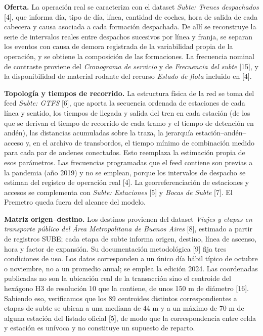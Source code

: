 \documentclass{article}
\begin{document}
\textbf{Oferta.} La operación real se caracteriza con el dataset \textit{Subte: Trenes despachados} [4],
que informa día, tipo de día, línea, cantidad de coches, hora de salida de cada cabecera y causa asociada a
cada formación despachada. De allí se reconstruye la serie de intervalos reales entre despachos sucesivos
por línea y franja, se separan los eventos con causa de demora registrada de la variabilidad propia de la
operación, y se obtiene la composición de las formaciones. La frecuencia nominal de contraste proviene del
\textit{Cronograma de servicio} y de \textit{Frecuencia del subte} [15], y la disponibilidad de material
rodante del recurso \textit{Estado de flota} incluido en [4].

\textbf{Topología y tiempos de recorrido.} La estructura física de la red se toma del feed
\textit{Subte: GTFS} [6], que aporta la secuencia ordenada de estaciones de cada línea y sentido, los
tiempos de llegada y salida del tren en cada estación (de los que se derivan el tiempo de recorrido de
cada tramo y el tiempo de detención en andén), las distancias acumuladas sobre la traza, la jerarquía
estación--andén--acceso y, en el archivo de transbordos, el tiempo mínimo de combinación medido para cada
par de andenes conectados. Esto reemplaza la estimación propia de esos parámetros. Las frecuencias programadas que el feed contiene son
previas a la pandemia (año 2019) y no se emplean, porque los intervalos de despacho se estiman del registro de
operación real [4]. La
georreferenciación de estaciones y accesos se complementa con \textit{Subte: Estaciones} [5] y
\textit{Bocas de Subte} [7]. El Premetro queda fuera del alcance del modelo.

\textbf{Matriz origen--destino.} Los destinos provienen del dataset \textit{Viajes y etapas en transporte
público del Área Metropolitana de Buenos Aires} [8], estimado a partir de registros SUBE; cada etapa de
subte informa origen, destino, línea de ascenso, hora y factor de expansión. Su documentación metodológica
[9] fija tres condiciones de uso. Los datos corresponden a un único día hábil típico de octubre o noviembre,
no a un promedio anual; se emplea la edición 2024. Las coordenadas publicadas no son la ubicación real de la
transacción sino el centroide del hexágono H3 de resolución 10 que la contiene, de unos 150 m de diámetro [16]. Sabiendo eso, verificamos que los 89 centroides distintos correspondientes a etapas de subte se ubican a una mediana de
44 m y a un máximo de 70 m de alguna estación del listado oficial [5], de modo que la correspondencia entre
celda y estación es unívoca y no constituye un supuesto de reparto.
\end{document}
